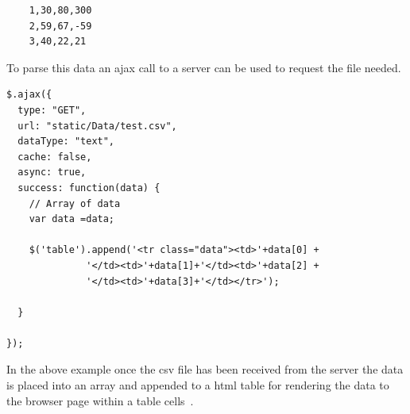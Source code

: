 \begin{verbatim}
	1,30,80,300
	2,59,67,-59
	3,40,22,21
\end{verbatim}

To parse this data an ajax call to a server can be used to request the file needed.~\cite{ParsingCSVExample:online}
\begin{verbatim}
$.ajax({
  type: "GET",
  url: "static/Data/test.csv",
  dataType: "text",
  cache: false,
  async: true,
  success: function(data) {
    // Array of data
    var data =data;

    $('table').append('<tr class="data"><td>'+data[0] + 
              '</td><td>'+data[1]+'</td><td>'+data[2] +
              '</td><td>'+data[3]+'</td></tr>');

  }

});
\end{verbatim}
In the above example once the csv file has been received from the server the data is placed into an array and appended to a html table for rendering the data to the browser page within a table cells~\cite{ParsingCSVExample:online}.
